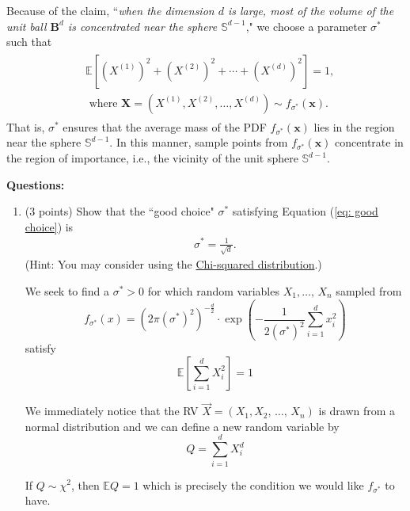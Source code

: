 \documentclass[11pt,letterpaper, leqno]{article}
\numberwithin{equation}{section}
\numberwithin{theorem}{section}
\numberwithin{lemma}{section}
\numberwithin{corollary}{section}
\numberwithin{definition}{section}
\numberwithin{proposition}{section}
\numberwithin{remark}{section}
\numberwithin{example}{section}
\newcommand{\E}{\mathbb{E}}
\begin{document}
\begin{enumerate}
        Because of the claim, ``\textit{when the dimension $d$ is large, most of the volume of the unit ball $\mathbf{B}^d$ is concentrated near the sphere $\mathbb{S}^{d-1}$}," we choose a parameter $\sigma^*$ such that
        \begin{align}\label{eq: good choice}
            \begin{aligned}
                & \mathbb{E}\left[\left(X^{(1)}\right)^2 + \left(X^{(2)}\right)^2 + \cdots + \left(X^{(d)}\right)^2\right] = 1, \\ 
            & \mbox{ where }\boldsymbol{X}=(X^{(1)}, X^{(2)}, \ldots, X^{(d)})\sim f_{\sigma^*}(\boldsymbol{x}).
            \end{aligned}
        \end{align}
        That is, $\sigma^*$ ensures that the average mass of the PDF $f_{\sigma^*}(\boldsymbol{x})$ lies in the region near the sphere $\mathbb{S}^{d-1}$. In this manner, sample points from $f_{\sigma^*}(\boldsymbol{x})$ concentrate in the region of importance, i.e., the vicinity of the unit sphere $\mathbb{S}^{d-1}$.
    
        \textbf{Questions:} 
            \begin{enumerate}
                \item (3 points) Show that the ``good choice" $\sigma^*$ satisfying Equation (\ref{eq: good choice}) is 
                    \begin{align*}
                        \sigma^*=\frac{1}{\sqrt{d}}.
                    \end{align*}
                    (Hint: You may consider using the \href{https://en.wikipedia.org/wiki/Chi-squared_distribution}{Chi-squared distribution}.)


                    \color{blue}
                        We seek to find a $\sigma^* > 0$ for which random variables $X_1, \dots,\, X_n$ sampled from 
                        \[f_{\sigma^*}(x) = (2\pi(\sigma^*)^{2})^{-\frac{d}{2}} \cdot \exp \left(-\frac{1}{2(\sigma^{*})^2} \sum_{i=1}^d x_i^2\right)\]
                        satisfy 
                        \[\E[\sum_{i=1}^d X_i^2] = 1\]

                        We immediately notice that the RV $\vec X = (X_1, X_2, \, \dots,\, X_n)$ is drawn from a normal distribution and we can define a new random variable by 
                        \[Q = \sum_{i=1}^d X_i^d\]
                        
                        If $Q \sim \chi^2$, then $\E Q = 1$ which is precisely the condition we would like $f_{\sigma^*}$ to have. 


\end{enumerate}
\end{enumerate}
\end{document}
